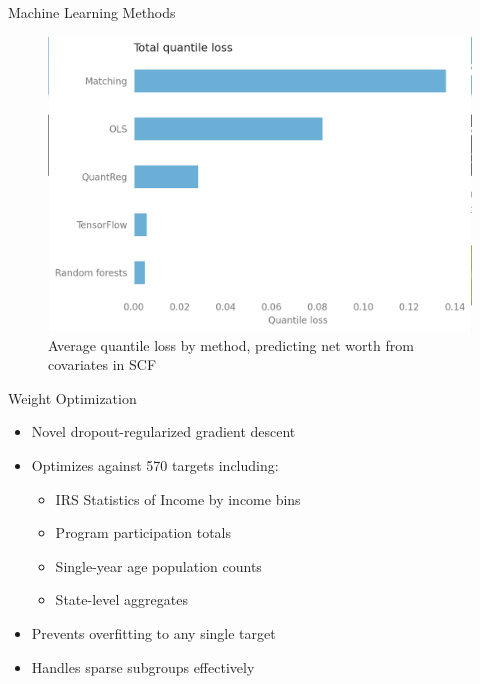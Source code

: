 \documentclass{beamer}
\begin{document}
\begin{frame}{Machine Learning Methods}
    \begin{figure}
        \centering
        \includegraphics[width=\textwidth]{../../paper/figures/quantile_loss.png}
        \caption{Average quantile loss by method, predicting net worth from covariates in SCF}
    \end{figure}
\end{frame}

\begin{frame}{Weight Optimization}
    \begin{itemize}
        \item Novel dropout-regularized gradient descent
        \item Optimizes against 570 targets including:
        \begin{itemize}
            \item IRS Statistics of Income by income bins
            \item Program participation totals
            \item Single-year age population counts
            \item State-level aggregates
        \end{itemize}
        \item Prevents overfitting to any single target
        \item Handles sparse subgroups effectively
    \end{itemize}
\end{frame}
\end{document}
